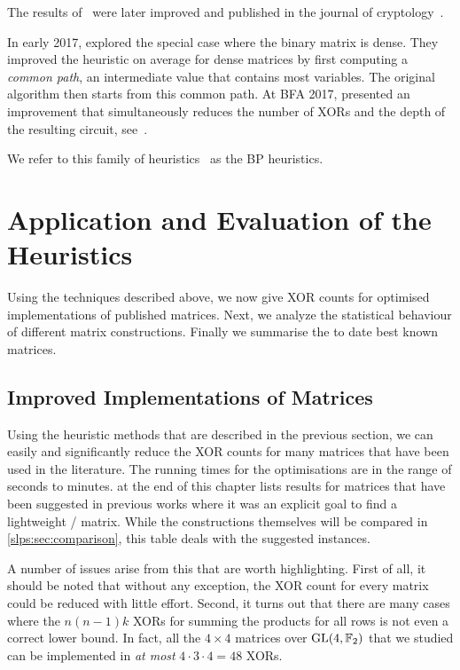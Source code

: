 The results of~\cite{MFCS:BoyMatPer08,SEA:BoyPer10} were later improved and published in the journal of cryptology~\cite{JC:BoyMatPer13}.

In early 2017, \textcite{EPRINT:VisSchPer17} explored the special case where the binary matrix is dense.
They improved the heuristic on average for dense matrices by first computing a \emph{common path}, an intermediate value that contains most variables.
The original algorithm then starts from this common path.
At BFA 2017, \citeauthor{BFA:BoyFinPer17} presented an improvement that simultaneously reduces the number of XORs and the depth of the resulting circuit, see~\cite{BFA:BoyFinPer17}.

We refer to this family of heuristics~\cite{MFCS:BoyMatPer08,SEA:BoyPer10,JC:BoyMatPer13,BFA:BoyFinPer17,EPRINT:VisSchPer17} as the \textsc{BP} heuristics.

\section{Application and Evaluation of the Heuristics}
\label{slps:sec:results}

Using the techniques described above, we now give XOR counts for optimised implementations of published matrices.
Next, we analyze the statistical behaviour of different matrix constructions.
Finally we summarise the to date best known matrices.

\subsection{Improved Implementations of Matrices}

Using the heuristic methods that are described in the previous section, we can easily and significantly reduce the XOR counts for many matrices that have been used in the literature.
The running times for the optimisations are in the range of seconds to minutes.
 at the end of this chapter lists results for matrices that have been suggested in previous works where it was an explicit goal to find a lightweight \MDS/ matrix.
While the constructions themselves will be compared in \cref{slps:sec:comparison}, this table deals with the suggested instances.

A number of issues arise from this that are worth highlighting.
First of all, it should be noted that without any exception, the XOR count for every matrix could be reduced with little effort.
Second, it turns out that there are many cases where the $n(n-1)k$ XORs for summing the products for all rows is not even a correct lower bound.
In fact, all the $4 \times 4$ matrices over $\mathrm{GL}(4, \mathbb{F}_2)$ that we studied can be implemented in \emph{at most} $4 \cdot 3 \cdot 4 = 48$ XORs.

